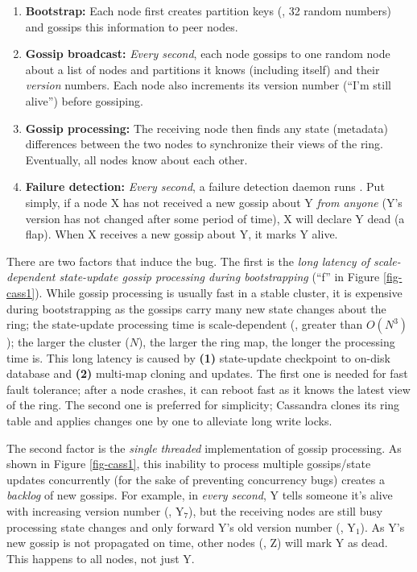 \begin{enumerate}

\item {\bf Bootstrap:} Each node first creates partition keys (\eg, 32 random
numbers) and gossips this information to peer nodes.
 
\item {\bf Gossip broadcast:} {\em Every second}, each node gossips to one
random node about a list of nodes and partitions it knows (including itself)
and their {\em version} numbers.  Each node also increments its version number
(``I'm still alive'') before gossiping.
 
\item {\bf Gossip processing:} The receiving node then finds any state
(metadata) differences between the two nodes to synchronize their views of the
ring.  Eventually, all nodes know about each other.
 
\item {\bf Failure detection:} {\em Every second}, a failure detection daemon
runs \cite{Lakshman+09-Cassandra}.  Put simply, if a node X has not received a
new gossip about Y {\em from anyone} (Y's version has not changed after some
period of time), X will declare Y dead (a flap).  When X receives a new gossip
about Y, it marks Y alive.

\end{enumerate}

There are two factors that induce the bug. The first is the {\em long latency
of scale-dependent state-update gossip processing during bootstrapping} (``f''
in Figure \ref{fig-cass1}).  While gossip processing is usually fast in a
stable cluster, it is expensive during bootstrapping as the gossips carry many
new state changes about the ring; the state-update processing time is
scale-dependent (\ie, greater than $O(N^3)$); the larger the cluster ($N$), the
larger the ring map, the longer the processing time is.
%
This long latency is caused by {\bf (1)} state-update checkpoint to on-disk
database and {\bf (2)} multi-map cloning and updates.
%
The first one is needed for fast fault tolerance; after a node crashes, it can
reboot fast as it knows the latest view of the ring.
%
The second one is preferred for simplicity; Cassandra clones its 
ring table and applies changes one by one to alleviate long write locks.
%

The second factor is the {\em single threaded} implementation of gossip
processing. As shown in Figure \ref{fig-cass1},  this inability to process
multiple gossips/state updates concurrently (for the sake of preventing
concurrency bugs) creates a {\em backlog} of new gossips.  For example, in {\em
every second}, Y tells someone it's alive with increasing version number (\eg,
Y$_7$), but the receiving nodes are still busy processing state changes and
only forward Y's old version number (\eg, Y$_1$).  As Y's new gossip is not
propagated on time,  other nodes (\eg, Z) will mark Y as dead.  This happens to
all nodes, not just Y.


